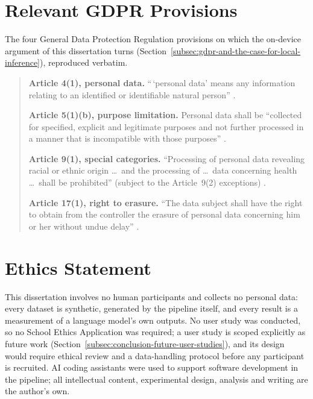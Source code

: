 \chapter{Relevant GDPR Provisions}
\label{chap:gdpr-articles}

The four General Data Protection Regulation provisions on which the on-device argument of this dissertation turns (Section~\ref{subsec:gdpr-and-the-case-for-local-inference}), reproduced verbatim.

\begin{quote}
  \textbf{Article 4(1), personal data.} ``\,`personal data' means any information relating to an identified or identifiable natural person'' \cite{gdpr2016}.

  \textbf{Article 5(1)(b), purpose limitation.} Personal data shall be ``collected for specified, explicit and legitimate purposes and not further processed in a manner that is incompatible with those purposes'' \cite{gdpr2016}.

  \textbf{Article 9(1), special categories.} ``Processing of personal data revealing racial or ethnic origin \dots\ and the processing of \dots\ data concerning health \dots\ shall be prohibited'' (subject to the Article~9(2) exceptions) \cite{gdpr2016}.

  \textbf{Article 17(1), right to erasure.} ``The data subject shall have the right to obtain from the controller the erasure of personal data concerning him or her without undue delay'' \cite{gdpr2016}.
\end{quote}

\chapter{Ethics Statement}
\label{chap:ethics-statement}

This dissertation involves no human participants and collects no personal data: every dataset is synthetic, generated by the pipeline itself, and every result is a measurement of a language model's own outputs. No user study was conducted, so no School Ethics Application was required; a user study is scoped explicitly as future work (Section~\ref{subsec:conclusion-future-user-studies}), and its design would require ethical review and a data-handling protocol before any participant is recruited. AI coding assistants were used to support software development in the pipeline; all intellectual content, experimental design, analysis and writing are the author's own.
